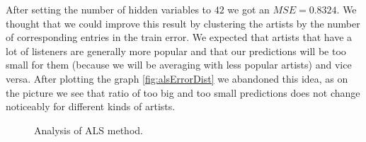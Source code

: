 \documentclass{report}
\begin{document}
After setting the number of hidden variables to $42$ we got an $MSE=0.8324$. We thought that we could improve this result by clustering the artists by the number of corresponding entries in the train error. We expected that artists that have a lot of listeners are generally more popular and that our predictions will be too small for them (because we will be averaging with less popular artists) and vice versa. After plotting the graph \ref{fig:alsErrorDist} we abandoned this idea, as on the picture we see that ratio of too big and too small predictions does not change noticeably for different kinds of artists.

\begin{figure}[!h]
\center
{}
\hfill
{}
\caption{Analysis of ALS method.}
\end{figure}
\end{document}

